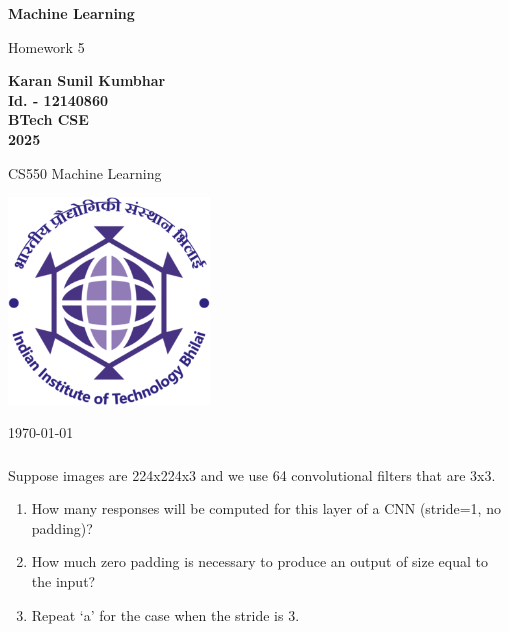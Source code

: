 \documentclass[10pt, a4paper]{article}
\newcommand\course{CS550 Machine Learning}                            %
\newcommand\hwnumber{ 5}                                 %
\newcommand\Information{Karan Sunil Kumbhar }                        %
\newcommand\Informatio{Id. - 12140860}
\newcommand\Informati{BTech CSE}
\newcommand\Informat{2025}
\begin{document}
\begin{titlepage}
    \begin{center}
        \vspace*{3cm}

        \Huge
        \textbf{Machine Learning}

        \vspace{1cm}
        \huge
        Homework\hwnumber

        \vspace{1.5cm}
        \Large

        \textbf{\Information}\\                      %
        \textbf{\Informatio}\\
        \textbf{\Informati} \\
        \textbf{\Informat} \\

        \vfill

        \course \

        \vspace{1cm}

        \includegraphics[width=0.4\textwidth]{iitbh.png}
        \\

        \Large

        \today

    \end{center}
\end{titlepage}


\newpage
\subsubsection*{}

\begin{Problem}
    Suppose images are 224x224x3 and we use 64 convolutional filters that are 3x3.
    \begin{enumerate}[label=\textbf{(\alph*)}]
        \item How many responses will be computed for this layer of a CNN (stride=1, no padding)?
        \item How much zero padding is necessary to produce an output of size equal to the input?
        \item Repeat `a' for the case when the stride is 3.
    \end{enumerate}
\end{Problem}
\end{document}
